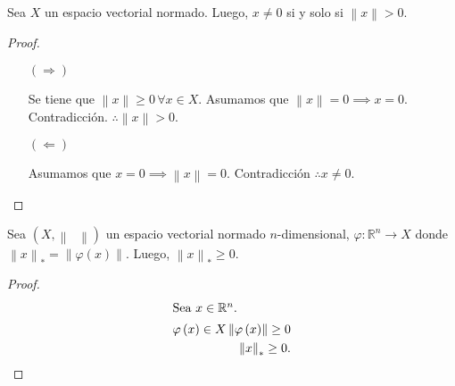 \begin{proposition*}
    Sea $X$ un espacio vectorial normado.
    Luego, $x\neq 0$ si y solo si $\left\|x\right\|>0$.
\end{proposition*}

\begin{proof}\leavevmode
    \begin{itemize}
        \item[$\left(\Rightarrow\right)$]

              Se tiene que $\left\|x\right\|\geq 0\,\forall x\in X$.
              Asumamos que $\left\|x\right\|=0\implies x=0$.
              Contradicción.
              $\therefore \left\|x\right\|>0$.

        \item[$\left(\Leftarrow\right)$]

              Asumamos que
              \begin{math}
                  x=
                  0\implies
                  \left\|x\right\|=
                  0
              \end{math}.
              Contradicción
              $\therefore x\neq0$.
    \end{itemize}
\end{proof}

\begin{proposition*}
    Sea $\left(X, \left\|\phantom{\cdot}\right\|\right)$
    un espacio vectorial normado $n$-dimensional,
    \begin{math}
        \varphi\colon
        \mathbb{R}^{n}\to X
    \end{math}
    donde
    \begin{math}
        {\left\|x\right\|}_{\ast}=
        \left\|\varphi\left(x\right)\right\|
    \end{math}.
    Luego,
    \begin{math}
        {\left\|x\right\|}_{\ast}\geq
        0
    \end{math}.
\end{proposition*}

\begin{proof}
    \begin{align*}
        \shortintertext{Sea $x\in\mathbb{R}^{n}$.}
        \varphi\left(x\right)\in X
        \left\|\varphi\left(x\right)\right\|\geq
        0 \\
        {\left\|x\right\|}_{\ast}\geq
        0.
    \end{align*}
\end{proof}

